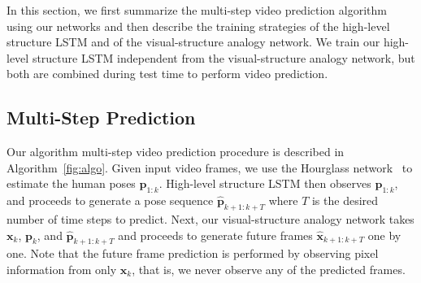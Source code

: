 \documentclass{article}
\newcommand{\x}{{\mathbf{x}}}
\newcommand{\p}{{\mathbf{p}}}
\newcommand{\cutsubsectionup}{\vspace*{-0.09in}}
\newcommand{\cutsubsectiondown}{\vspace*{-0.04in}}
\newcommand{\cutsubsectionup}{}
\newcommand{\cutsubsectiondown}{}
\begin{document}
In this section, we first summarize the multi-step video prediction algorithm using our networks and then describe the training strategies of the high-level structure LSTM and of the visual-structure analogy network.
We train our high-level structure LSTM independent from the visual-structure analogy network, but both are combined during test time to perform video prediction.

\cutsubsectionup\subsection{Multi-Step Prediction}\cutsubsectiondown
Our algorithm multi-step video prediction procedure is described in Algorithm~\ref{fig:algo}.
Given input video frames, we use the Hourglass network~\cite{hourglass} to estimate the human poses $\p_{1:k}$.
High-level structure LSTM then observes $\p_{1:k}$, and proceeds to generate a pose sequence $\hat{\p}_{k+1:k+T}$ where $T$ is the desired number of time steps to predict.
Next, our visual-structure analogy network takes $\x_k$, $\p_k$, and $\hat{\p}_{k+1:k+T}$ and proceeds to generate future frames $\hat{\x}_{k+1:k+T}$ one by one.
Note that the future frame prediction is performed by observing pixel information from only $\x_k$, that is, we never observe any of the predicted frames.
\end{document}
